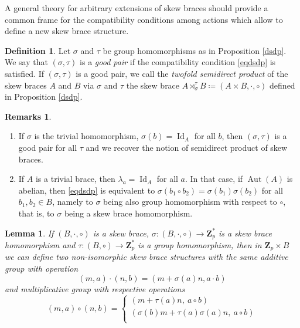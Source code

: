 \documentclass[12pt]{article}
\newtheorem{lemma}[theorem]{Lemma}
\theoremstyle{definition}
\newtheorem{definition}[theorem]{Definition}
\newtheorem{remarks}[theorem]{Remarks}
\newcommand{\Z}{\mathbf Z}
\newcommand{\Aut}{\operatorname{Aut}}
\newcommand{\Id}{\operatorname{Id}}
\begin{document}
A general theory for arbitrary extensions of skew braces should provide a common frame for the compatibility conditions among actions which allow to define a new skew brace structure.
    
	\begin{definition}\label{twofoldsemidprod}
		Let $\sigma$ and $\tau$ be group homomorphisms as in Proposition \ref{dsdp}. We say that $(\sigma,\tau)$ is a \textit{good pair} if the compatibility condition \eqref{eqdsdp} is satisfied. If $(\sigma,\tau)$ is a good pair,  we call the {\it twofold semidirect product} of the skew braces $A$ and $B$ via $\sigma$ and $\tau$ the skew brace $A\rtimes_{\sigma}^{\tau}B\coloneqq(A\times B, \cdot,\circ)$ defined in Proposition \ref{dsdp}.
	\end{definition}
	
	\begin{remarks}
		\begin{enumerate}
			\item If $\sigma$ is the trivial homomorphism, $\sigma(b)=\Id_A$ for all $b$, then 
            $(\sigma, \tau)$ is a good pair for all $\tau$   and we recover the notion of semidirect product of skew braces.
			\item If $A$ is a trivial brace, then $\lambda_a=\Id_A$ for all $a$. In that case, if  $\Aut(A)$ is abelian, then \eqref{eqdsdp} is equivalent to $\sigma(b_1\circ b_2)=\sigma(b_1)\sigma(b_2)$ for all $b_1,b_2 \in B$, namely to $\sigma$ being also group homomorphism with respect to $\circ$, that is, to $\sigma$ being a skew brace homomorphism.
		\end{enumerate}
		
	\end{remarks}
	
	\begin{lemma}\label{rm}If $(B,\cdot,\circ)$ is a skew brace, $\sigma:(B,\cdot,\circ)\to \Z_p^*$ is a skew brace homomorphism and $\tau:(B,\circ)\to \Z_p^*$ is a group homomorphism, then 
		in $\Z_p\times B$ we can define two non-isomorphic skew brace structures with the same additive group with operation
		$$
		(m,a)\cdot (n,b)=(m+\sigma(a)n, a\cdot b)
		$$
		and multiplicative group with respective operations
		\begin{equation}\label{compa}
		(m,a)\circ (n,b)=
		\left\{
		\begin{matrix}
		(m+\tau(a)n,\ a\circ b)\\
		(\sigma(b)m+\tau(a)\sigma(a)n,\ a\circ b)\\
		\end{matrix}
		\right.
		\end{equation}
	\end{lemma}
	
\end{document}
